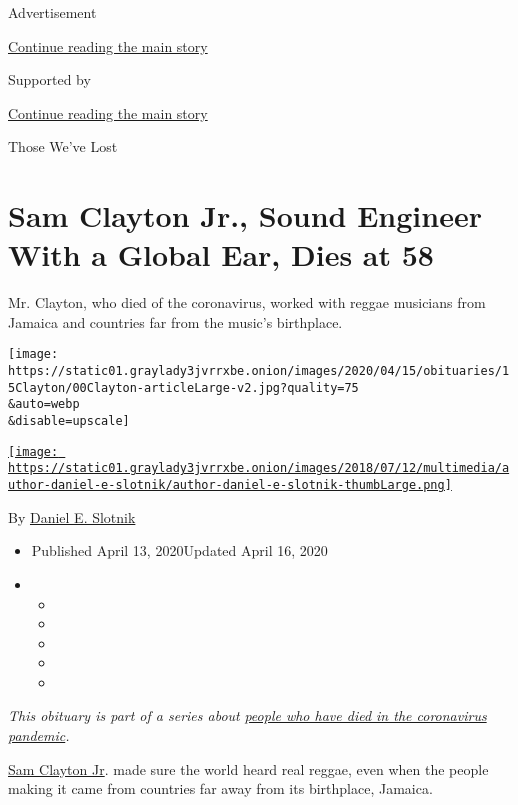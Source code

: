 Advertisement

\protect\hyperlink{after-top}{Continue reading the main story}

Supported by

\protect\hyperlink{after-sponsor}{Continue reading the main story}

Those We've Lost

\hypertarget{sam-clayton-jr-sound-engineer-with-a-global-ear-dies-at-58}{%
\section{Sam Clayton Jr., Sound Engineer With a Global Ear, Dies at
58}\label{sam-clayton-jr-sound-engineer-with-a-global-ear-dies-at-58}}

Mr. Clayton, who died of the coronavirus, worked with reggae musicians
from Jamaica and countries far from the music's birthplace.

\texttt{[image: https://static01.graylady3jvrrxbe.onion/images/2020/04/15/obituaries/15Clayton/00Clayton-articleLarge-v2.jpg?quality=75\\\&auto=webp\\\&disable=upscale]}

\href{https://www.nytimes3xbfgragh.onion/by/daniel-e-slotnik}{\texttt{[image: https://static01.graylady3jvrrxbe.onion/images/2018/07/12/multimedia/author-daniel-e-slotnik/author-daniel-e-slotnik-thumbLarge.png]}}

By \href{https://www.nytimes3xbfgragh.onion/by/daniel-e-slotnik}{Daniel
E. Slotnik}

\begin{itemize}
\item
  Published April 13, 2020Updated April 16, 2020
\item
  \begin{itemize}
  \item
  \item
  \item
  \item
  \item
  \end{itemize}
\end{itemize}

\emph{This obituary is part of a series about}
\href{https://www.nytimes3xbfgragh.onion/series/people-who-have-died-of-the-coronavirus}{\emph{people
who have died in the coronavirus pandemic}}\emph{.}

\href{https://www.reggaeville.com/artist-details/brain-damage/news/view/rip-sam-clayton-jr/}{Sam
Clayton Jr}. made sure the world heard real reggae, even when the people
making it came from countries far away from its birthplace, Jamaica.


